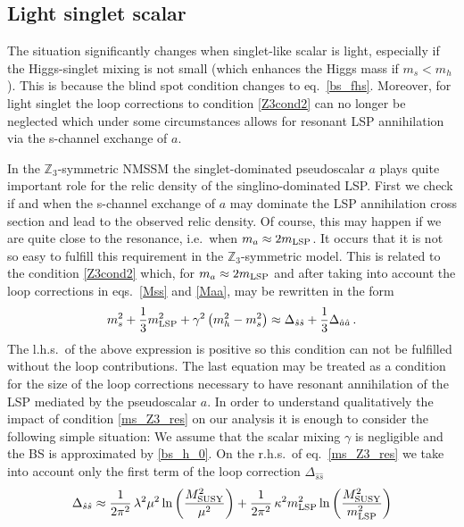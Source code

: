 \documentclass[12pt,twoside]{article}
\def\hatss{\hat{s}\hat{s}}
\def\hataa{\hat{a}\hat{a}}
\def\mlsp{m_{\rm LSP}}
\begin{document}
\subsection{Light singlet scalar}
\label{subsec:Z3light}

The situation significantly changes when singlet-like scalar is light, 
especially if the Higgs-singlet mixing is not small (which enhances 
the Higgs mass if $m_s<m_h$). This is because the blind spot condition 
changes to eq.~\eqref{bs_fhs}. Moreover, for light singlet the loop 
corrections to condition \eqref{Z3cond2} can no longer be neglected 
which under some circumstances allows for resonant LSP annihilation via
the s-channel exchange of $a$. 


In the $\mathbb Z_3$-symmetric NMSSM the singlet-dominated pseudoscalar $a$ 
plays quite important role for the relic density of the singlino-dominated 
LSP. First we check if and when the s-channel exchange of $a$ may 
dominate the LSP annihilation cross section and lead to the observed
relic density. Of course, this may happen if we are quite close to the 
resonance, i.e.~when $m_a\approx2\mlsp$. It occurs that it is not so easy 
to fulfill this requirement in the $\mathbb Z_3$-symmetric model. 
This is related to the condition \eqref{Z3cond2} which, for $m_a\approx2\mlsp$
and after taking into account the loop corrections in eqs.~\eqref{Mss} 
and \eqref{Maa}, may be rewritten in the form
%
\begin{equation}
\label{ms_Z3_res}
m_s^2 +\frac13 \mlsp^2 
+\gamma^2\left(m_h^2-m_s^2\right)
\approx
\Delta_{\hatss} + \frac13 \Delta_{\hataa}
\,.
\end{equation}
%
The l.h.s.~of the above expression is positive 
so this condition can not be fulfilled without the loop contributions. 
The last equation may be treated as a condition 
for the size of the loop corrections necessary to have resonant  
annihilation of the LSP mediated by the pseudoscalar $a$. 
In order to understand qualitatively the impact of condition 
\eqref{ms_Z3_res} on our analysis it is enough to consider the 
following simple situation: We assume that the scalar mixing $\gamma$
is negligible and the BS is approximated by \eqref{bs_h_0}.
On the r.h.s.~of eq.~\eqref{ms_Z3_res} we take into account only
the first term of the loop correction $\Delta_{\hatss}$ \cite{reviewEllwanger}
%
%
\begin{equation}
\label{Delta_ss}
\Delta_{\hatss}
\approx
\frac{1}{2\pi^2}\,\lambda^2 \mu^2 \ln\left(\frac{M_{\rm SUSY}^2}{\mu^2}\right)
+
\frac{1}{2\pi^2}\,\kappa^2 \mlsp^2 \ln\left(\frac{M_{\rm SUSY}^2}{\mlsp^2}\right)
\end{equation}
\end{document}
